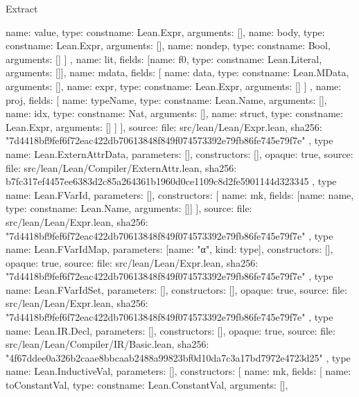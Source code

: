 \begin{lexlean}{Extract}
\begin{toolingmodule}
{{{            {name: value, type: const{name: Lean.Expr, arguments: []}},
            {name: body, type: const{name: Lean.Expr, arguments: []}},
            {name: nondep, type: const{name: Bool, arguments: []}}
          ]
        },
        {name: lit, fields: [{name: f0, type: const{name: Lean.Literal, arguments: []}}]},
        {
          name: mdata,
          fields: [
            {name: data, type: const{name: Lean.MData, arguments: []}},
            {name: expr, type: const{name: Lean.Expr, arguments: []}}
          ]
        },
        {
          name: proj,
          fields: [
            {name: typeName, type: const{name: Lean.Name, arguments: []}},
            {name: idx, type: const{name: Nat, arguments: []}},
            {name: struct, type: const{name: Lean.Expr, arguments: []}}
          ]
        }
      ],
      source: {
        file: src/lean/Lean/Expr.lean,
        sha256: "7d4418bf9fef6f72eac422db70613848f849f074573392e79fb86fe745e79f7e"
      }
    },
    type{
      name: Lean.ExternAttrData,
      parameters: [],
      constructors: [],
      opaque: true,
      source: {
        file: src/lean/Lean/Compiler/ExternAttr.lean,
        sha256: b7fc317ef4457ee6383d2c85a264361b1960d0ce1109c8d2fe5901144d323345
      }
    },
    type{
      name: Lean.FVarId,
      parameters: [],
      constructors: [
        {name: mk, fields: [{name: name, type: const{name: Lean.Name, arguments: []}}]}
      ],
      source: {
        file: src/lean/Lean/Expr.lean,
        sha256: "7d4418bf9fef6f72eac422db70613848f849f074573392e79fb86fe745e79f7e"
      }
    },
    type{
      name: Lean.FVarIdMap,
      parameters: [{name: "α", kind: type{}}],
      constructors: [],
      opaque: true,
      source: {
        file: src/lean/Lean/Expr.lean,
        sha256: "7d4418bf9fef6f72eac422db70613848f849f074573392e79fb86fe745e79f7e"
      }
    },
    type{
      name: Lean.FVarIdSet,
      parameters: [],
      constructors: [],
      opaque: true,
      source: {
        file: src/lean/Lean/Expr.lean,
        sha256: "7d4418bf9fef6f72eac422db70613848f849f074573392e79fb86fe745e79f7e"
      }
    },
    type{
      name: Lean.IR.Decl,
      parameters: [],
      constructors: [],
      opaque: true,
      source: {
        file: src/lean/Lean/Compiler/IR/Basic.lean,
        sha256: "4f67ddee0a326b2caae8bbcaab2488a99823bf0d10da7c3a17bd7972e4723d25"
      }
    },
    type{
      name: Lean.InductiveVal,
      parameters: [],
      constructors: [
        {
          name: mk,
          fields: [
            {name: toConstantVal, type: const{name: Lean.ConstantVal, arguments: []}},
}}}
\end{toolingmodule}
\end{lexlean}
